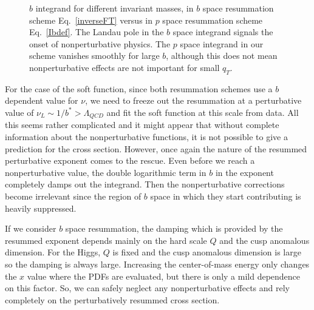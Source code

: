 \documentclass[a4,letterpaper,11pt]{article}
\newcommand{\eq}[1]{Eq.~\eqref{#1}}
\begin{document}
\begin{figure}
\centerline{}
\vskip-0.5cm
\caption[1]{$b$ integrand for different invariant masses, in $b$ space resummation scheme \eq{inverseFT} versus in $p$ space resummation scheme \eq{Ibdef}. The Landau pole in the $b$ space integrand signals the onset of nonperturbative physics. The $p$ space integrand in our scheme vanishes smoothly for large $b$, although this does not mean nonperturbative effects are not important for small $q_T$.}
\label{fig:nonpert} 
\end{figure}

For the case of the soft function, since both resummation schemes use a $b$ dependent value for $\nu$, we need to freeze out the resummation at a perturbative value of $\nu_L \sim 1/b^* > \Lambda_{QCD}$ and fit the soft function at this scale from data. All this seems rather complicated and it might appear that without complete information about the nonperturbative functions, it is not possible to give a prediction for the cross section. However, once again the nature of the resummed perturbative exponent comes to the rescue. Even before we reach a nonperturbative value, the double logarithmic term in $b$ in the exponent completely damps out the integrand. Then the nonperturbative corrections become irrelevant since the region of $b$ space in which they start contributing is heavily suppressed. 

If we consider $b$ space resummation, the damping which is provided by the resummed exponent depends mainly on the hard scale $Q$ and the cusp anomalous dimension. For the Higgs, $Q$ is fixed and the cusp anomalous dimension is large so the damping is always large. Increasing the center-of-mass energy only changes the $x$ value where the PDFs are evaluated, but there is only a mild dependence on this factor. So, we can safely neglect any nonperturbative effects and rely completely on the perturbatively resummed cross section.
\end{document}
